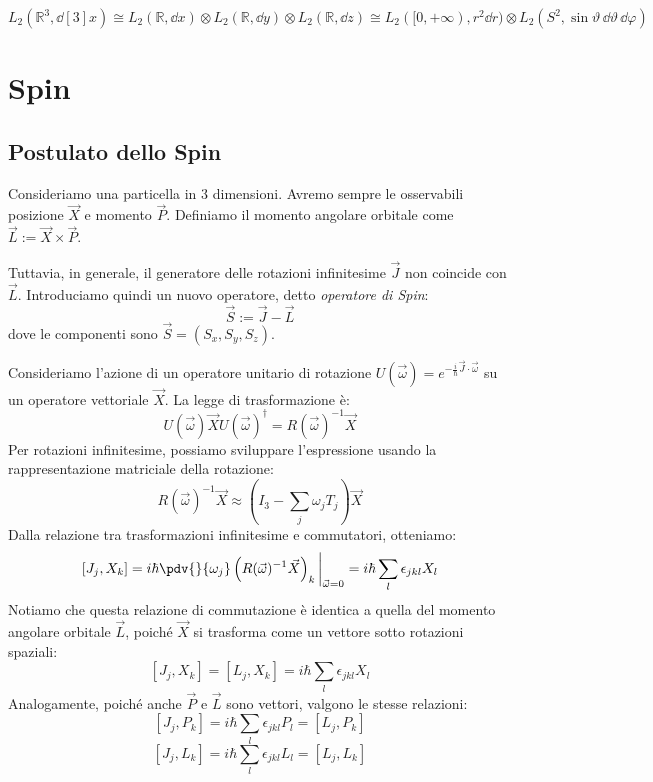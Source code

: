 \begin{example}
    \[
        L_2(\mathbb{R}^3, \dd[3]{x}) \cong L_2(\mathbb{R}, \dd{x}) \otimes L_2(\mathbb{R}, \dd{y}) \otimes L_2(\mathbb{R}, \dd{z})
        \cong L_2([0,+\infty), r^2 \dd{r}) \otimes L_2(S^2, \sin\vartheta \, \dd{\vartheta} \, \dd{\varphi})    
    \]
\end{example}

\section{Spin}
\subsection{Postulato dello Spin}

Consideriamo una particella in 3 dimensioni. Avremo sempre le osservabili posizione \(\vec{X}\) e momento \(\vec{P}\).
Definiamo il momento angolare orbitale come \(\vec{L} := \vec{X} \times \vec{P}\).

Tuttavia, in generale, il generatore delle rotazioni infinitesime \(\vec{J}\) non coincide con \(\vec{L}\). Introduciamo quindi un nuovo operatore, detto \textit{operatore di Spin}:
\begin{equation}
    \vec{S} := \vec{J} - \vec{L} 
\end{equation}
dove le componenti sono \(\vec{S} = (S_x, S_y, S_z)\).

Consideriamo l'azione di un operatore unitario di rotazione \(U(\vec{\omega}) = e^{-\frac{i}{\hbar}\vec{J}\cdot\vec{\omega}}\) su un operatore vettoriale \(\vec{X}\). 
La legge di trasformazione è:
\[
U(\vec{\omega})\vec{X}U(\vec{\omega})^\dagger = R(\vec{\omega})^{-1}\vec{X}
\]
Per rotazioni infinitesime, possiamo sviluppare l'espressione usando la rappresentazione matriciale della rotazione:
\[
R(\vec{\omega})^{-1}\vec{X} \approx \left( I_3 - \sum_j \omega_j T_j \right)\vec{X}
\]
Dalla relazione tra trasformazioni infinitesime e commutatori, otteniamo:
\[
[J_j, X_k] = i\hbar \pdv{}{\omega_j} \left( R(\vec{\omega})^{-1}\vec{X} \right)_k \bigg|_{\vec{\omega}=0} = i\hbar \sum_l \epsilon_{jkl} X_l
\]
Notiamo che questa relazione di commutazione è identica a quella del momento angolare orbitale \(\vec{L}\), poiché \(\vec{X}\) si trasforma come un vettore sotto rotazioni spaziali:
\[
[J_j, X_k] = [L_j, X_k] = i\hbar \sum_l \epsilon_{jkl} X_l
\]
Analogamente, poiché anche \(\vec{P}\) e \(\vec{L}\) sono vettori, valgono le stesse relazioni:
\[
[J_j, P_k] = i\hbar \sum_l \epsilon_{jkl} P_l = [L_j, P_k]
\]
\[
[J_j, L_k] = i\hbar \sum_l \epsilon_{jkl} L_l = [L_j, L_k]
\]

